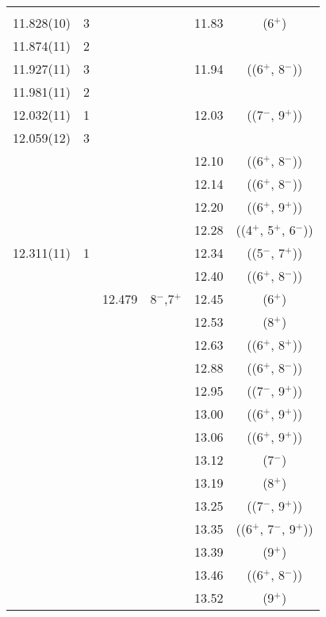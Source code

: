 \begin{center}
\begin{longtable}{cc cc cc}
  &   &   &   &   &                           \\
   11.828(10)     & 3 &   &   & 11.83 & (6$^+$)                   \\
     11.874(11)   & 2 &   &   &   &                           \\
    11.927(11)    & 3 &   &   & 11.94 & ((6$^+$, 8$^-$))          \\
    11.981(11)    & 2 &   &   &   &                           \\
     12.032(11)   & 1 &   &   & 12.03 & ((7$^-$, 9$^+$))          \\
     12.059(12)   & 3 &   &   &   &                           \\
  &   &   &   & 12.10 & ((6$^+$, 8$^-$))          \\
  &   &   &   & 12.14 & ((6$^+$, 8$^-$))          \\
  &   &   &   & 12.20 & ((6$^+$, 9$^+$))          \\
  &   &   &   & 12.28 & ((4$^+$, 5$^+$, 6$^-$))   \\
    12.311(11)    & 1 &   &   & 12.34 & ((5$^-$, 7$^+$))          \\
  &   &   &   & 12.40 & ((6$^+$, 8$^-$))          \\
  &   & 12.479  & 8$^-$,7$^+$ & 12.45 & (6$^+$)                   \\
  &   &   &   & 12.53 & (8$^+$)                   \\
  &   &   &   & 12.63 & ((6$^+$, 8$^+$))          \\
  &   &   &   & 12.88 & ((6$^+$, 8$^-$))          \\
  &   &   &   & 12.95 & ((7$^-$, 9$^+$))          \\
  &   &   &   & 13.00 & ((6$^+$, 9$^+$))          \\
  &   &   &   & 13.06 & ((6$^+$, 9$^+$))          \\
  &   &   &   & 13.12 & (7$^-$)                   \\
  &   &   &   & 13.19 & (8$^+$)                   \\
  &   &   &   & 13.25 & ((7$^-$, 9$^+$))          \\
  &   &   &   & 13.35 & ((6$^+$, 7$^-$, 9$^+$))   \\
  &   &   &   & 13.39 & (9$^+$)                   \\
  &   &   &   & 13.46 & ((6$^+$, 8$^-$))          \\
  &   &   &   & 13.52 & (9$^+$)                   \\

\end{longtable}
\end{center}
